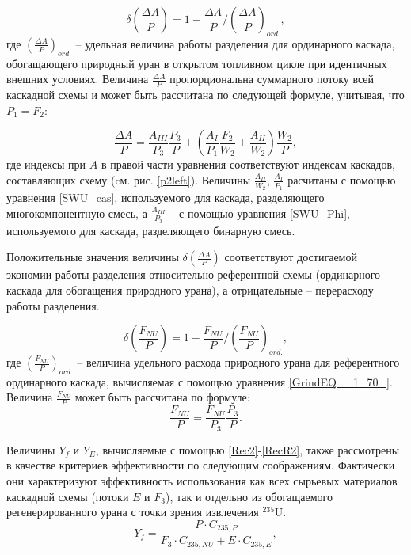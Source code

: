 \begin{equation} \label{DeltaA} 
    \delta(\frac{\Delta A}{P})=1-\frac{\Delta A}{P}/(\frac{\Delta A}{P})_{ord.},
\end{equation}
где $(\frac{\Delta A}{P})_{ord.}$ -- удельная величина работы разделения для ординарного каскада, обогащающего природный уран в открытом топливном цикле при идентичных внешних условиях. Величина $\frac{\Delta A}{P}$ пропорциональна суммарного потоку всей каскадной схемы и может быть рассчитана по следующей формуле, учитывая, что ${P_1}={F_2}$:

\begin{equation} \label{DeltaAP}
  \frac{\Delta A}{P} = \frac{A_{III}}{P_3} \frac{P_3}{P}+\left(\frac{A_I}{P_1} \frac{F_2}{W_2}+\frac{A_{II}}{W_2}\right) \frac{W_2}{P},
\end{equation}
где индексы при $A$ в правой части уравнения соответствуют индексам каскадов, составляющих схему (cм. рис. \ref{p2left}). Величины $\frac{A_{II}}{W_2}$, $\frac{A_I}{P_1}$ расчитаны с помощью уравнения \ref{SWU_cas}, используемого для каскада, разделяющего многокомпонентную смесь, а $\frac{A_{III}}{P_3}$ -- с помощью уравнения \ref{SWU_Phi}, используемого для каскада, разделяющего бинарную смесь.

Положительные значения величины $\delta(\frac{\Delta A}{P})$ соответствуют достигаемой экономии работы разделения относительно референтной схемы (ординарного каскада для обогащения природного урана), а отрицательные -- перерасходу работы разделения.

\begin{equation} \label{DeltaFnu} 
    \delta(\frac{F_{NU}}{P})=1-\frac{F_{NU}}{P}/(\frac{F_{NU}}{P})_{ord.},
\end{equation} 
где $(\frac{F_{NU}}{P})_{ord.}$ -- величина удельного расхода природного урана для референтного ординарного каскада, вычисляемая с помощью уравнения \ref{GrindEQ__1_70_}. Величина $\frac{F_{NU}}{P}$ может быть рассчитана по формуле:
\begin{equation} \label{Delta_Fnu}
    \frac{F_{NU}}{P} = \frac{F_{NU}}{P_3} \frac{P_3}{P}.
\end{equation}

Величины $Y_f$ и $Y_{E}$, вычисляемые с помощью \ref{Rec2}-\ref{RecR2}, также рассмотрены в качестве критериев эффективности по следующим соображениям. Фактически они характеризуют эффективность использования как всех сырьевых материалов каскадной схемы (потоки $E$ и $F_3$), так и отдельно из обогащаемого регенерированного урана с точки зрения извлечения $^{235}$U.
\begin{equation} \label{Rec2} 
    Y_f = \frac{P \cdot C_{235,P}}{F_3 \cdot C_{235,NU} + E \cdot C_{235,E}}, 
\end{equation} 

